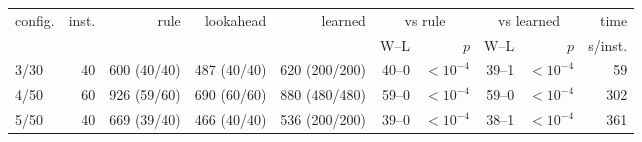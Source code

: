 \begin{tabular}{lrrrrrrrrr}
\toprule
config. & inst. & rule & lookahead & learned & \multicolumn{2}{c}{vs rule} & \multicolumn{2}{c}{vs learned} & time \\
\cmidrule(lr){6-7}\cmidrule(lr){8-9}
 & & & & & W--L & $p$ & W--L & $p$ & s/inst. \\
\midrule
3/30 & 40 & 600 (40/40) & 487 (40/40) & 620 (200/200) & 40--0 & $<10^{-4}$ & 39--1 & $<10^{-4}$ & 59 \\
4/50 & 60 & 926 (59/60) & 690 (60/60) & 880 (480/480) & 59--0 & $<10^{-4}$ & 59--0 & $<10^{-4}$ & 302 \\
5/50 & 40 & 669 (39/40) & 466 (40/40) & 536 (200/200) & 39--0 & $<10^{-4}$ & 38--1 & $<10^{-4}$ & 361 \\
\bottomrule
\end{tabular}%
